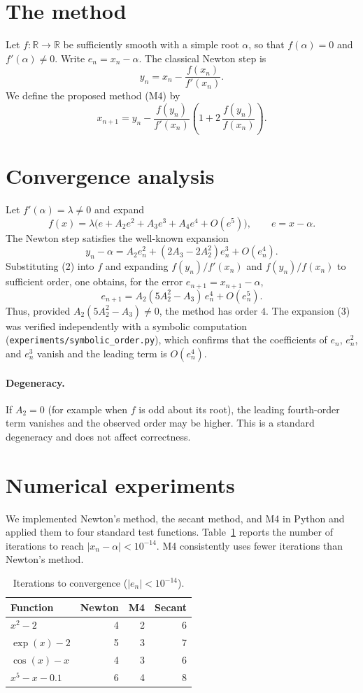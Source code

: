 \documentclass[11pt]{article}
\begin{document}
\section{The method}
Let $f:\mathbb{R}\to\mathbb{R}$ be sufficiently smooth with a simple
root $\alpha$, so that $f(\alpha)=0$ and $f'(\alpha)\neq0$. Write
$e_n=x_n-\alpha$. The classical Newton step is
\[
y_n = x_n-\frac{f(x_n)}{f'(x_n)}.
\]
We define the proposed method (M4) by
\[
x_{n+1}=y_n-\frac{f(y_n)}{f'(x_n)}
\left(1+2\,\frac{f(y_n)}{f(x_n)}\right).
\tag{1}
\]

\section{Convergence analysis}
Let $f'( \alpha)=\lambda\neq0$ and expand
\[
f(x)=\lambda\bigl(e+A_2e^2+A_3e^3+A_4e^4+O(e^5)\bigr),
\qquad e=x-\alpha.
\]
The Newton step satisfies the well-known expansion
\[
y_n-\alpha = A_2 e_n^2+(2A_3-2A_2^2)e_n^3+O(e_n^4).
\tag{2}
\]
Substituting (2) into $f$ and expanding $f(y_n)/f'(x_n)$ and
$f(y_n)/f(x_n)$ to sufficient order, one obtains, for the error
$e_{n+1}=x_{n+1}-\alpha$,
\[
e_{n+1} = A_2(5A_2^2-A_3)\,e_n^4 + O(e_n^5).
\tag{3}
\]
Thus, provided $A_2(5A_2^2-A_3)\neq0$, the method has order $4$. The
expansion (3) was verified independently with a symbolic computation
(\texttt{experiments/symbolic\_order.py}), which confirms that the
coefficients of $e_n$, $e_n^2$, and $e_n^3$ vanish and the leading
term is $O(e_n^4)$.

\paragraph{Degeneracy.}
If $A_2=0$ (for example when $f$ is odd about its root), the leading
fourth-order term vanishes and the observed order may be higher. This
is a standard degeneracy and does not affect correctness.

\section{Numerical experiments}
We implemented Newton's method, the secant method, and M4 in Python
and applied them to four standard test functions. Table~\ref{tab:bench}
reports the number of iterations to reach $|x_n-\alpha|<10^{-14}$.
M4 consistently uses fewer iterations than Newton's method.

\begin{table}[ht]
\centering
\caption{Iterations to convergence ($|e_n|<10^{-14}$).}
\label{tab:bench}
\begin{tabular}{lrrr}
\toprule
Function & Newton & M4 & Secant \\
\midrule
$x^2-2$ & 4 & 2 & 6 \\
$\exp(x)-2$ & 5 & 3 & 7 \\
$\cos(x)-x$ & 4 & 3 & 6 \\
$x^5-x-0.1$ & 6 & 4 & 8 \\
\bottomrule
\end{tabular}
\end{table}
\end{document}
